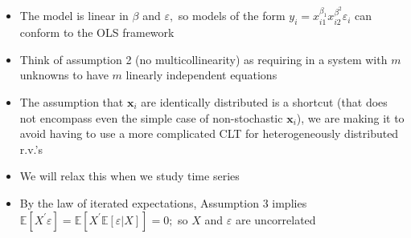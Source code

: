 \documentclass[notes=show]{beamer}
\begin{document}
\begin{frame}%


\begin{itemize}
\item The model is linear in $\beta $ and $\varepsilon ,$ so models of the
form $y_{i}=x_{i1}^{\beta _{1}}x_{i2}^{\beta ^{2}}\varepsilon _{i}$ can
conform to the OLS framework

\item Think of assumption 2 (no multicollinearity) as requiring in a system
with $m$ unknowns to have $m$ linearly independent equations

\item The assumption that $\mathbf{x}_{i}$ are identically distributed is a
shortcut (that does not encompass even the simple case of non-stochastic $%
\mathbf{x}_{i}$), we are making it to avoid having to use a more complicated
CLT for heterogeneously distributed r.v.'s

\item We will relax this when we study time series

\item By the law of iterated expectations, Assumption 3 implies $\mathbb{E}%
[X^{\prime }\varepsilon ]=\mathbb{E}[X^{\prime }\mathbb{E}[\varepsilon
|X]]=0;$ so $X$ and $\varepsilon $ are uncorrelated
\end{itemize}

\end{frame}%
\end{document}
